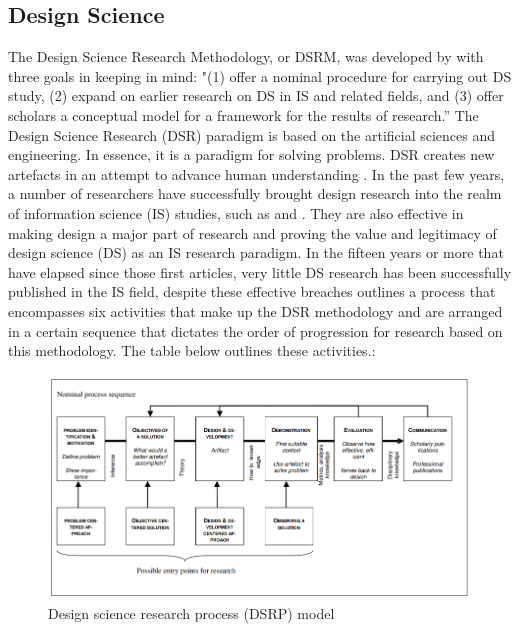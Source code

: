 \subsection{Design Science}
\par{The Design Science Research Methodology, or DSRM, was developed by \cite{peffers2007design} with three goals in keeping in mind: "(1) offer a nominal procedure for carrying out DS study, (2) expand on earlier research on DS in IS and related fields, and (3) offer scholars a conceptual model for a framework for the results of research.” The Design Science Research (DSR) paradigm is based on the artificial sciences and engineering. In essence, it is a paradigm for solving problems. DSR creates new artefacts in an attempt to advance human understanding \citep{hevner2010design}. In the past few years, a number of researchers have successfully brought design research into the realm of information science (IS) studies, such as \cite{hevner2004design} and \cite{walls1992building}. They are also effective in making design a major part of research and proving the value and legitimacy of design science (DS) as an IS research paradigm. In the fifteen years or more that have elapsed since those first articles, very little DS research has been successfully published in the IS field, despite these effective breaches \citep{peffers2007design} outlines a process that encompasses six activities that make up the DSR methodology and are arranged in a certain sequence that dictates the order of progression for research based on this methodology. The table below outlines these activities.:}
\clearpage
\begin{figure}[h!]
    \centering
    \includegraphics[width=1\linewidth]{img/Design science research process (DSRP) model.png}
    \caption{Design science research process (DSRP) model}
    \label{fig:enter-label}
\end{figure}
